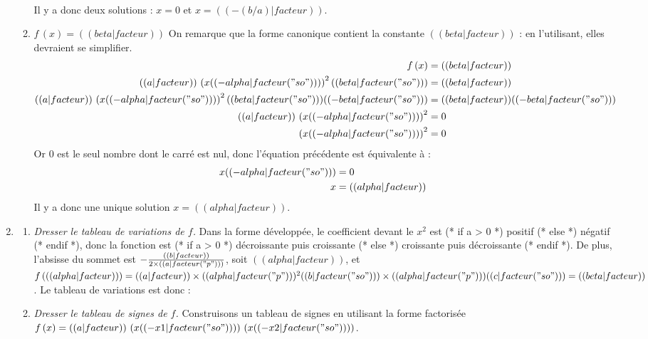 \begin{enumerate}
\begin{enumerate}
\begin{align*}
\end{align*}
Il y a donc deux solutions : $x=0$ et $x=(( -(b/a)|facteur ))$.
\item $f\,(x)=(( beta|facteur ))$ On remarque que la forme canonique contient la constante $(( beta|facteur ))$ : en l'utilisant, elles devraient se simplifier.
\begin{align*}
f\,(x) &= (( beta|facteur)) \\
(( a|facteur )) \,\left( x (( -alpha|facteur("so") )) \right)^2 (( beta|facteur("so") )) &= (( beta|facteur ))\\
(( a|facteur )) \,\left( x (( -alpha|facteur("so") )) \right)^2 (( beta|facteur("so") )) (( -beta|facteur("so") )) &= (( beta|facteur )) (( -beta|facteur("so") ))\\
(( a|facteur )) \,\left( x (( -alpha|facteur("so") )) \right)^2 &= 0\\
\left( x (( -alpha|facteur("so") )) \right)^2 &= 0\\
\end{align*}
Or $0$ est le seul nombre dont le carré est nul, donc l'équation précédente est équivalente à :
\begin{align*}
x (( -alpha|facteur("so") )) &= 0\\
x &= (( alpha|facteur )) \\
\end{align*}
Il y a donc une unique solution $x=(( alpha|facteur ))$.
\end{enumerate}
\item
\begin{enumerate}
\item \emph{Dresser le tableau de variations de $f$.} Dans la forme développée, le coefficient devant le $x^2$ est 
(* if a > 0 *) positif (* else *) négatif (* endif *),
donc la fonction est 
(* if a > 0 *) décroissante puis croissante (* else *) croissante puis décroissante (* endif *).
De plus, l'absisse du sommet est $-\frac{(( b|facteur ))}{2\times{}(( a|facteur("p") ))}$, soit $(( alpha|facteur ))$, et
$f\,( (( alpha|facteur )) )=(( a|facteur ))\times{}(( alpha|facteur("p") ))^2 (( b|facteur("so") ))\times{} (( alpha|facteur("p") )) (( c|facteur("so") ))=(( beta|facteur ))$.
Le tableau de variations est donc :
\begin{center}
\end{center}
\item \emph{Dresser le tableau de signes de $f$.} Construisons un tableau de signes en utilisant la forme factorisée $f\,(x)=(( a|facteur )) \,\left(x (( -x1|facteur("so") ))\right) \, \left(x (( -x2|facteur("so") ))\right)$.


\end{enumerate}
\end{enumerate}
